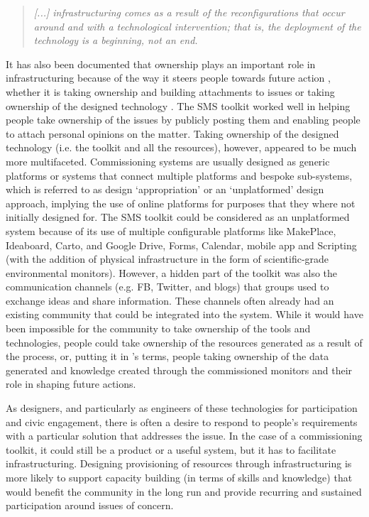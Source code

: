 \begin{quote}
    \textit{[...] infrastructuring comes as a result of the reconfigurations that occur around and with a technological intervention; that is, the deployment of the technology is a beginning, not an end.} \citep[p .249]{dantec_infrastructuring_2013}
\end{quote}

It has also been documented that ownership plays an important role in infrastructuring because of the way it steers people towards future action \citep{dantec_infrastructuring_2013}, whether it is taking ownership and building attachments to issues \citep{marres_issues_2007,disalvo_local_2009,asad_tap_2017} or taking ownership of the designed technology \citep{disalvo_towards_2009}. The SMS toolkit worked well in helping people take ownership of the issues by publicly posting them and enabling people to attach personal opinions on the matter. Taking ownership of the designed technology (i.e. the toolkit and all the resources), however, appeared to be much more multifaceted. Commissioning systems are usually designed as generic platforms or systems that connect multiple platforms and bespoke sub-systems, which is referred to as design `appropriation' \citep{dix_designing_2007} or an `unplatformed' design \citet{lambton-howard_whatfutures_2019} approach, implying the use of online platforms for purposes that they where not initially designed for. The SMS toolkit could be considered as an unplatformed system because of its use of multiple configurable platforms like MakePlace, Ideaboard, Carto, and Google Drive, Forms, Calendar, mobile app and Scripting (with the addition of physical infrastructure in the form of scientific-grade environmental monitors). However, a hidden part of the toolkit was also the communication channels (e.g. FB, Twitter, and blogs) that groups used to exchange ideas and share information. These channels often already had an existing community that could be integrated into the system. While it would have been impossible for the community to take ownership of the tools and technologies, people could take ownership of the resources generated as a result of the process, or, putting it in \citet{dantec_infrastructuring_2013}'s terms, people taking ownership of the data generated and knowledge created through the commissioned monitors and their role in shaping future actions.

As designers, and particularly as engineers of these technologies for participation and civic engagement, there is often a desire to respond to people's requirements with a particular solution that addresses the issue. In the case of a commissioning toolkit, it could still be a product or a useful system, but it has to facilitate infrastructuring. Designing provisioning of resources through infrastructuring is more likely to support capacity building (in terms of skills and knowledge) that would benefit the community in the long run and provide recurring and sustained participation around issues of concern.

